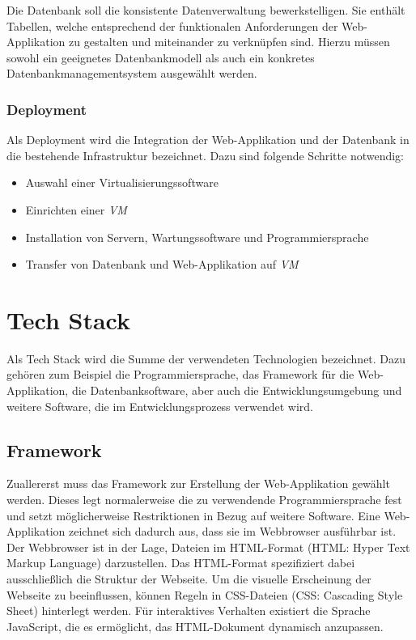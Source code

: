 \documentclass[
]{article}
\providecommand{\tightlist}{%
  \setlength{\itemsep}{0pt}\setlength{\parskip}{0pt}}
\begin{document}
Die Datenbank soll die konsistente Datenverwaltung bewerkstelligen. Sie enthält Tabellen, welche entsprechend der funktionalen Anforderungen der Web-Applikation zu gestalten und miteinander zu verknüpfen sind. Hierzu müssen sowohl ein geeignetes Datenbankmodell als auch ein konkretes Datenbankmanagementsystem ausgewählt werden.

\hypertarget{deployment}{%
\subsubsection{Deployment}\label{deployment}}

Als Deployment wird die Integration der Web-Applikation und der Datenbank in die bestehende Infrastruktur bezeichnet. Dazu sind folgende Schritte notwendig:

\begin{itemize}
\tightlist
\item
  Auswahl einer Virtualisierungssoftware
\item
  Einrichten einer \emph{VM}
\item
  Installation von Servern, Wartungssoftware und Programmiersprache
\item
  Transfer von Datenbank und Web-Applikation auf \emph{VM}
\end{itemize}

\hypertarget{tech-stack}{%
\section{Tech Stack}\label{tech-stack}}

Als Tech Stack wird die Summe der verwendeten Technologien bezeichnet. Dazu gehören zum Beispiel die Programmiersprache, das Framework für die Web-Applikation, die Datenbanksoftware, aber auch die Entwicklungsumgebung und weitere Software, die im Entwicklungsprozess verwendet wird.

\hypertarget{framework}{%
\subsection{Framework}\label{framework}}

Zuallererst muss das Framework zur Erstellung der Web-Applikation gewählt werden. Dieses legt normalerweise die zu verwendende Programmiersprache fest und setzt möglicherweise Restriktionen in Bezug auf weitere Software. Eine Web-Applikation zeichnet sich dadurch aus, dass sie im Webbrowser ausführbar ist. Der Webbrowser ist in der Lage, Dateien im HTML-Format (HTML: Hyper Text Markup Language) darzustellen. Das HTML-Format spezifiziert dabei ausschließlich die Struktur der Webseite. Um die visuelle Erscheinung der Webseite zu beeinflussen, können Regeln in CSS-Dateien (CSS: Cascading Style Sheet) hinterlegt werden. Für interaktives Verhalten existiert die Sprache JavaScript, die es ermöglicht, das HTML-Dokument dynamisch anzupassen.
\end{document}
